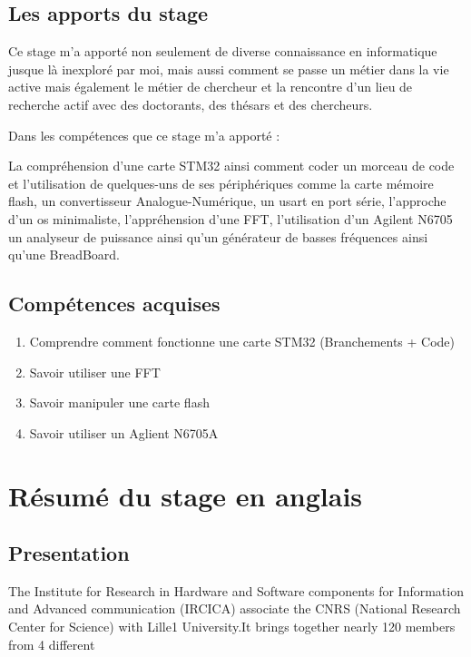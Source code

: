 \documentclass[a4paper]{article}
\begin{document}
\subsection{Les apports du stage}

Ce stage m'a apporté non seulement de diverse connaissance en informatique jusque là inexploré par moi, mais aussi comment se passe un métier dans la vie active mais également le métier de chercheur et la rencontre d'un lieu de recherche actif avec des doctorants, des thésars et des chercheurs.

Dans les compétences que ce stage m'a apporté :

La compréhension d'une carte STM32 ainsi comment coder un morceau de code et l'utilisation de quelques-uns de ses périphériques comme la carte mémoire flash, un convertisseur Analogue-Numérique, un usart en port série, l'approche d'un os minimaliste, l'appréhension d'une FFT, l'utilisation d'un Agilent N6705 un analyseur de puissance ainsi qu'un générateur de basses fréquences ainsi qu'une BreadBoard. 

\subsection{Compétences acquises}
\begin{enumerate}
\item{Comprendre comment fonctionne une carte STM32 (Branchements + Code)}
\item{Savoir utiliser une FFT}
\item{Savoir manipuler une carte flash}
\item{Savoir utiliser un Aglient N6705A}
\end{enumerate}



\section{Résumé du stage en anglais}

\subsection{ Presentation}

The Institute for Research in Hardware and Software components for Information and Advanced communication (IRCICA) associate the CNRS (National Research Center for Science) with Lille1 University.It brings together nearly 120 members from 4 different
\end{document}
